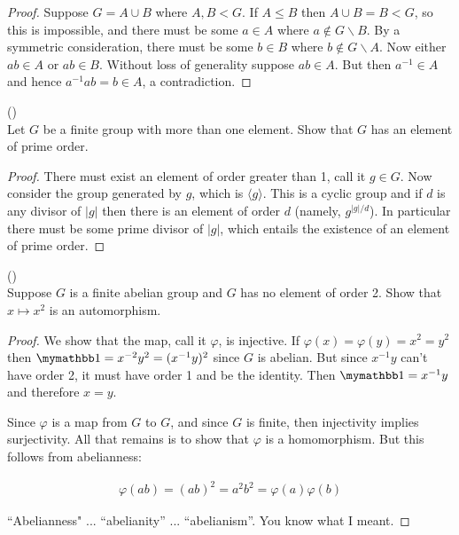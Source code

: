 \documentclass{exam}
\begin{document}
\begin{questions}
\begin{proof}
  Suppose $G=A\cup B$ where $A,B<G$.  If $A\leq B$ then $A\cup B=B<G$, so this is impossible, and there must be some $a\in A$ where $a\not\in G\smallsetminus B$.  By a symmetric consideration, there must be some $b\in B$ where $b\not\in G\smallsetminus A$.  Now either $ab\in A$ or $ab\in B$.  Without loss of generality suppose $ab\in A$.  But then $a^{-1}\in A$ and hence $a^{-1}ab = b\in A$, a contradiction.  \Lightning
\end{proof}

\question()\\
Let $G$ be a finite group with more than one element.  Show that $G$ has an element of prime order.

\begin{proof}
  There must exist an element of order greater than 1, call it $g\in G$.  Now consider the group generated by $g$, which is $\langle g\rangle$.  This is a cyclic group and if $d$ is any divisor of $|g|$ then there is an element of order $d$ (namely, $g^{|g|/d}$).  In particular there must be some prime divisor of $|g|$, which entails the existence of an element of prime order.
\end{proof}

\question()\\
Suppose $G$ is a finite abelian group and $G$ has no element of order 2.  Show that $x\mapsto x^2$ is an automorphism.

\begin{proof}
  We show that the map, call it $\varphi$, is injective.  If $\varphi(x)=\varphi(y)=x^2=y^2$ then $\mymathbb 1 = x^{-2}y^2 = (x^{-1}y)^2$ since $G$ is abelian.  But since $x^{-1}y$ can't have order 2, it must have order 1 and be the identity.  Then $\mymathbb 1 = x^{-1}y$  and therefore $x=y$.

  Since $\varphi$ is a map from $G$ to $G$, and since $G$ is finite, then injectivity implies surjectivity.  All that remains is to show that $\varphi$ is a homomorphism.  But this follows from abelianness:

  \begin{align*}
    \varphi(ab)=(ab)^2 = a^2b^2 = \varphi(a)\varphi(b)
  \end{align*}

  ``Abelianness" ... ``abelianity'' ... ``abelianism''.  You know what I meant.
\end{proof}

\end{questions}
\end{document}
